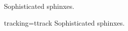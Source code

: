 \documentclass{article}
\begin{document}
Sophisticated sphinxes.\par
\begin{microtypecontext}{tracking=ttrack}
  Sophisticated sphinxes.\par
\end{microtypecontext}
\end{document}

